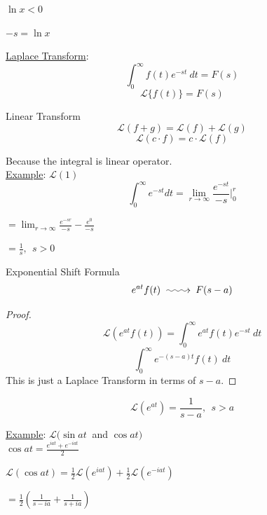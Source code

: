 \documentclass[12pt]{article}
\makeatletter
\numberwithin{equation}{subsection}
\newcommand{\indb}{\hspace{1cm}}
\newcommand{\indd}{\hspace{2cm}}
\newcommand{\indh}{\hspace{4cm}}
\newcommand{\indm}{\hspace{6.5cm}}
\newcommand{\indu}{\hspace{10.5cm}}
\newcommand{\exa}{\noindent \underline{Example}: \hspace{1cm}}
\newcommand{\longsquiggly}{\xymatrix{{}\ar@{~>}[r]&{}}}
\makeatother
\begin{document}
\indu $\ln x < 0$

\indu $-s =\ln x $

\underline{Laplace Transform}:
\begin{equation}
\int_{0}^{\infty}f(t)e^{-st} \ dt = F(s)
\end{equation}
\begin{equation}
\mathscr{L}\{ f(t) \} = F(s)
\end{equation}

Linear Transform
\begin{equation}
\mathscr{L}(f+g)=\mathscr{L}(f)+\mathscr{L}(g)
\end{equation}
\begin{equation}
\mathscr{L}(c\cdot f)= c \cdot \mathscr{L}(f)
\end{equation}

\indb Because the integral is linear operator.\\

\exa $\mathscr{L}(1)$
$$ \int_0^\infty e^{-st} dt = \lim_{r \rightarrow \infty}\frac{e^{-st}}{-s} \biggr\rvert^{r}_0$$

\indm $\displaystyle = \lim_{r \rightarrow \infty}\frac{e^{-sr}}{-s} - \frac{e^0}{-s}$

\indm $= \frac{1}{s}, \ \ s > 0$

Exponential Shift Formula
\begin{equation}
e^{at}f(t)\longsquiggly F(s-a)
\end{equation}

\begin{proof}
\begin{equation}
\mathscr{L}(e^{at}f(t))=\int_0^\infty e^{at}f(t)e^{-st}\ dt
\end{equation}
\begin{equation}
\int_0^\infty e^{-(s-a)t}f(t) \ dt
\end{equation}
This is just a Laplace Transform in terms of $s-a$.
\end{proof}
$$\mathscr{L}(e^{at})=\frac{1}{s-a},\ \ s>a $$
\newpage

\exa $\mathscr{L}(\sin at\ $ and $\cos at )$\\

\indd $\cos at = \frac{e^{iat}+e^{-iat}}{2}$

\indd $\mathscr{L}(\cos at) =\frac{1}{2} \mathscr{L}(e^{iat})+\frac{1}{2}\mathscr{L}(e^{-iat})$

\indh $= \frac{1}{2}\left( \frac{1}{s-ia} + \frac{1}{s+ia}\right) $\\
\end{document}
